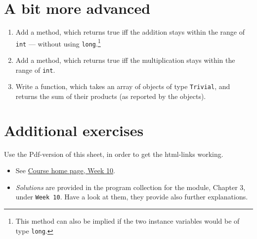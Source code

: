 \documentclass[11pt]{article}
\begin{document}
\section{A bit more advanced}
\label{sec:advanced}

\begin{enumerate}
\item Add a method, which returns true iff the addition stays within the range of \texttt{int} --- without using \texttt{long}.\footnote{This method can also be implied if the two instance variables would be of type \texttt{long}.}
\item Add a method, which returns true iff the multiplication stays within the range of \texttt{int}.
\item Write a function, which takes an array of objects of type \texttt{Trivial}, and returns the sum of their products (as reported by the objects).
\end{enumerate}


\section{Additional exercises}
\label{sec:addex}

Use the Pdf-version of this sheet, in order to get the html-links working.
\begin{itemize}
\item See \href{\chp#ExercisesWeek10}{Course home page, Week 10}.
\item \emph{Solutions} are provided in the program collection for the module, Chapter 3, under \texttt{Week 10}. Have a look at them, they provide also further explanations.
\end{itemize}
\end{document}
